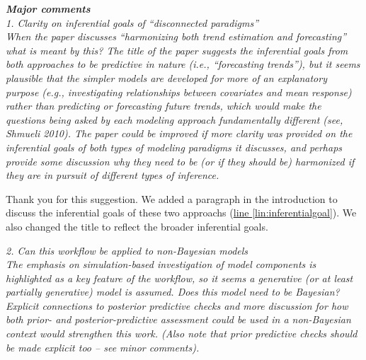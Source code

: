 \documentclass[11pt,letter]{article}
\begin{document}

\begin{mybox}
\emph{\textbf{Major comments}\\
1. Clarity on inferential goals of “disconnected paradigms”\\
 When the paper discusses “harmonizing both trend estimation and forecasting” what is meant by this? The title of the paper suggests the inferential goals from both approaches to be predictive in nature (i.e., “forecasting trends”), but it seems plausible that the simpler models are developed for more of an explanatory purpose (e.g., investigating relationships between covariates and mean response) rather than predicting or forecasting future trends, which would make the questions being asked by each modeling approach fundamentally different (see, Shmueli 2010). The paper could be improved if more clarity was provided on the inferential goals of both types of modeling paradigms it discusses, and perhaps provide some discussion why they need to be (or if they should be) harmonized if they are in pursuit of different types of inference.}
\end{mybox}

Thank you for this suggestion. We added a paragraph in the introduction to discuss the inferential goals of these two approachs (\href{file:forecastflows_r1\#lintarget:inferentialgoal}{line \ref*{lin:inferentialgoal}}). We also changed the title to reflect the broader inferential goals.

\begin{mybox}
\emph{2. Can this workflow be applied to non-Bayesian models\\
The emphasis on simulation-based investigation of model components is highlighted as a key feature of
the workflow, so it seems a generative (or at least partially generative) model is assumed. Does this model need to be Bayesian? Explicit connections to posterior predictive checks and more discussion for how both prior- and posterior-predictive assessment could be used in a non-Bayesian context would strengthen this work. (Also note that prior predictive checks should be made explicit too – see minor comments).}
\end{mybox}
\end{document}
